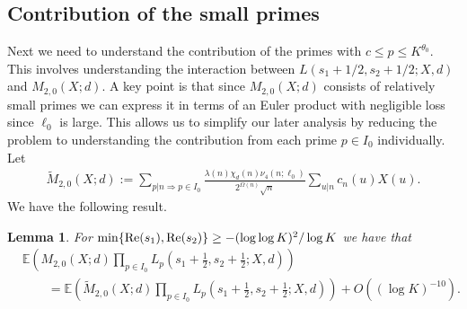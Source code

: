 \documentclass[a4paper,10pt,twoside]{amsart}
\newtheorem{lemma}[theorem]{Lemma}
\theoremstyle{definition}
\numberwithin{equation}{section}
\renewcommand{\Re}{\textnormal{Re}}
\renewcommand\:{\colon}
\begin{document}
\subsection{Contribution of the small primes} Next we need to understand the contribution of the primes with $c\leq p\leq K^{\theta_0}$. This involves understanding the interaction between $L(s_1+1/2,s_2+1/2;X,d)$ and $M_{2,0}(X;d)$. A key point is that since $M_{2,0}(X;d)$ consists of relatively small primes we can express it in terms of an Euler product with negligible loss since $\ell_0$ is large. This allows us to simplify our later analysis by reducing the problem to understanding the contribution from each prime $p\in I_0$ individually. Let 
\begin{align}\label{modified-zero}
\widetilde M_{2,0}(X;d):=\sum_{p|n\Rightarrow p\in I_0}\frac{\lambda(n)\chi_d(n)\nu_4(n;\ell_0)}{2^{\Omega(n)}\sqrt n}\sum_{u|n}c_n(u)X(u).
\end{align}
We have the following result.
\begin{lemma}\label{small-primes}
For $\min\{\Re(s_1),\Re(s_2)\}\geq -(\log\log K)^2/\log K$ we have that 
\begin{align*}
&\mathbb E\left(M_{2,0}(X;d)\prod_{p\in I_0}L_p\left(s_1+\frac12,s_2+\frac12;X,d\right)\right)\\
&\qquad=\mathbb E\left(\widetilde M_{2,0}(X;d)\prod_{p\in I_0}L_p\left(s_1+\frac12,s_2+\frac12;X,d\right)\right)+O\left((\log K)^{-10}\right).
\end{align*}
\end{lemma}
\end{document}
